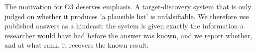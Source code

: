 The motivation for O3 deserves emphasis. A target-discovery system that is only judged on whether it produces 'a plausible list' is unfalsifiable. We therefore use published answers as a hindcast: the system is given exactly the information a researcher would have had before the answer was known, and we report whether, and at what rank, it recovers the known result.


